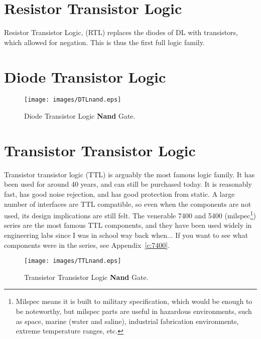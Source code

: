 \section{Resistor Transistor Logic}
Resistor Transistor Logic, (RTL) replaces the diodes of DL with transistors, which allowed for negation.  This is thus the first full logic family.


\section{Diode Transistor Logic}


\begin{figure}
\begin{center}
\caption{Diode Transistor Logic \textbf{Nand} Gate.}\label{f:DTL_nand}
\texttt{[image: images/DTLnand.eps]}
\end{center}
\end{figure}

\section{Transistor Transistor Logic}
Transistor transistor logic (TTL) is arguably the most famous logic family.  It has been used for around 40 years, and can still be purchased today.  It is reasonably fast, has good noise rejection, and has good protection from static.  A large number of interfaces are TTL compatible, so even when the components are not used, its design implications are still felt.  The venerable 7400 and 5400 (milspec\footnote{Milspec means it is built to military specification, which would be enough to be noteworthy, but milspec parts are useful in hazardous environments, such as space, marine (water and saline), industrial fabrication environments, extreme temperature ranges, etc.}) series are the most famous TTL components, and they have been used widely in engineering labs since I was in school way back when...  If you want to see what components were in the series, see Appendix~\ref{c:7400}.



\begin{figure}
\begin{center}
\caption{Transistor Transistor Logic \textbf{Nand} Gate.}\label{f:TTL_nand}
\texttt{[image: images/TTLnand.eps]}
\end{center}
\end{figure}

